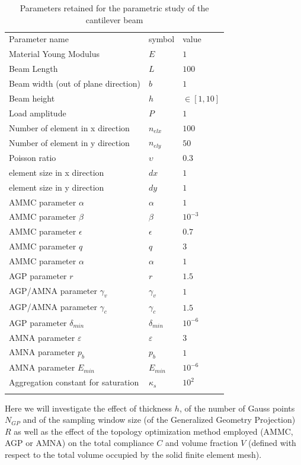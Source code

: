 \begin{table}[h!]
\caption{Parameters retained for the parametric study of the cantilever beam}
\label{tab:2}       %
\centering
\begin{tabular}{lll}
\hline\noalign{\smallskip}
Parameter name & symbol & value \\
\noalign{\smallskip}\hline\noalign{\smallskip}
Material Young Modulus & $E$ & $1$\\
Beam Length & $L$ & $100$ \\
Beam width (out of plane direction) & $b$ & $1$\\
Beam height & $h$ & $\in [1,10]$ \\
Load amplitude & $P$ & $1$\\
Number of element in x direction & $n_{elx}$ & $100$\\
Number of element in y direction & $n_{ely}$ & $50$\\
Poisson ratio & $\upsilon$ & $0.3$\\
element size in x direction & $dx$ & $1$\\
element size in y direction & $dy$ & $1$\\
AMMC parameter $\alpha$ & $\alpha$ & $1$\\
AMMC parameter $\beta$ & $\beta$ & $10^{-3}$\\
AMMC parameter $\epsilon$ & $\epsilon$ & $0.7$\\
AMMC parameter $q$ & $q$ & $3$\\
AMMC parameter $\alpha$ & $\alpha$ & $1$\\
AGP parameter $r$ & $r$ & $1.5$\\
AGP/AMNA parameter $\gamma_v$ & $\gamma_v$ & $1$\\
AGP/AMNA parameter $\gamma_c$ & $\gamma_c$ & $1.5$\\
AGP parameter $\delta_{min}$ & $\delta_{min}$ & $10^{-6}$\\
AMNA parameter $\varepsilon$ & $\varepsilon$ & $3$\\
AMNA parameter $p_b$ & $p_b$ & $1$\\
AMNA parameter $E_{min}$ & $E_{min}$ & $10^{-6}$\\
Aggregation constant for saturation & $\kappa_s$ & $10^{2}$\\
\noalign{\smallskip}\hline
\end{tabular}
\end{table}
Here we will investigate the effect of thickness $h$, of the number of Gauss points $N_{GP}$ and of the sampling window size (of the Generalized Geometry Projection) $R$ as well as the effect of the topology optimization method employed (AMMC, AGP or AMNA) on the total compliance $C$ and volume fraction $V$ (defined with respect to the total volume occupied by the solid finite element mesh).
